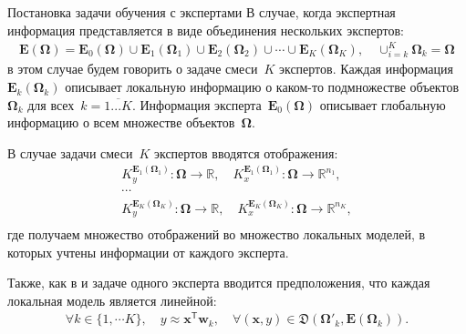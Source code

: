 \documentclass[9pt,pdf,hyperref={unicode}]{beamer}
\begin{document}
\begin{frame}{Постановка задачи обучения с экспертами}
\justifying
В случае, когда экспертная информация представляется в виде объединения нескольких экспертов:
\begin{equation*}
\label{eq:st:5}
\begin{aligned}
\bm{E}\left(\bm{\Omega}\right) = \bm{E}_0\left(\bm{\Omega}\right)\cup\bm{E}_1\left(\bm{\Omega}_1\right)\cup\bm{E}_2\left(\bm{\Omega}_2\right)\cup\cdots\cup\bm{E}_K\left(\bm{\Omega}_K\right), \quad \cup_{i=k}^{K}\bm{\Omega}_k=\bm{\Omega}
\end{aligned}
\end{equation*}
в этом случае будем говорить о задаче смеси~$K$ экспертов. Каждая информация~$\bm{E}_k\left(\bm{\Omega}_k\right)$ описывает локальную информацию о каком-то подмножестве объектов~$\bm{\Omega}_k$ для всех~$k=\overline{1...K}$. Информация эксперта~$\bm{E}_0\left(\bm{\Omega}\right)$ описывает глобальную информацию о всем множестве объектов~$\bm{\Omega}$.

В случае задачи смеси~$K$ экспертов вводятся отображения:
\begin{equation*}
\label{eq:st:6}
\begin{aligned}
K_y^{\bm{E}_1\left(\bm{\Omega}_1\right)} :\bm{\Omega}\to \mathbb{R}, \quad K_x^{\bm{E}_1\left(\bm{\Omega}_1\right)} :\bm{\Omega}\to \mathbb{R}^{n_1},\\
\cdots\\
K_y^{\bm{E}_K\left(\bm{\Omega}_K\right)} :\bm{\Omega}\to \mathbb{R}, \quad K_x^{\bm{E}_K\left(\bm{\Omega}_K\right)} :\bm{\Omega}\to \mathbb{R}^{n_K},\\
\end{aligned}
\end{equation*}
где получаем множество отображений во множество локальных моделей, в которых учтены информации от каждого эксперта.

Также, как в и задаче одного эксперта вводится предположения, что каждая локальная модель является линейной:
\begin{equation*}
\label{eq:st:7}
\begin{aligned}
\forall k\in\{1,\cdots K\}, \quad y \approx \textbf{x}^{\mathsf{T}}\textbf{w}_k, \quad \forall\left(\textbf{x}, y\right)\in\mathfrak{D}\left(\bm{\Omega}'_{k},\bm{E}\left(\bm{\Omega}_k\right)\right).
\end{aligned}
\end{equation*}

\end{frame}
\end{document}
